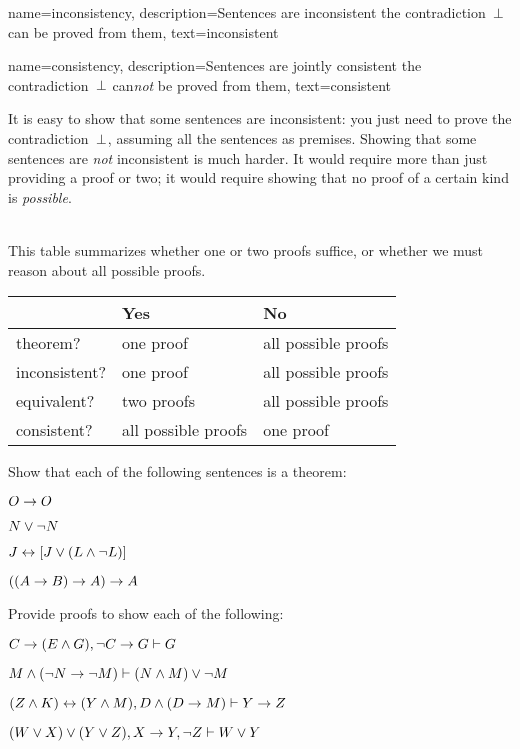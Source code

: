 {    name={inconsistency}, 
  description={Sentences are inconsistent \ifeff{} the contradiction~$\bot$ can be proved from them},
    text={inconsistent}
}

{    name={consistency}, 
  description={Sentences are jointly consistent \ifeff{} the contradiction~$\bot$ can\emph{not} be proved from them},
    text={consistent}
}

It is easy to show that some sentences are inconsistent: you just need
to prove the contradiction~$\bot$, assuming all the sentences as
premises. Showing that some sentences are \emph{not} inconsistent is much
harder. It would require more than just providing a proof or two; it
would require showing that no proof of a certain kind is
\emph{possible}.

\
\\
This table summarizes whether one or two proofs suffice, or whether we must reason about all possible proofs.

\begin{center}
\begin{tabular}{l l l}
 & \textbf{Yes} & \textbf{No}\\
 \hline
theorem? & one proof & all possible proofs\\
inconsistent? &  one proof  & all possible proofs\\
equivalent? & two proofs & all possible proofs\\
consistent? & all possible proofs & one proof\\
\end{tabular}
\end{center}


\practiceproblems
\problempart
Show that each of the following sentences is a theorem:
\begin{compactlist}
\item $O \rightarrow O$
\item $N \vee \neg N$
\item $J \leftrightarrow [J\vee (L\wedge\neg L)]$
\item $((A \rightarrow B) \rightarrow A) \rightarrow A$ 
\end{compactlist}

\problempart
Provide proofs to show each of the following:
\begin{compactlist}
\item $C\rightarrow(E\wedge G), \neg C \rightarrow G \vdash G$
\item $M \wedge (\neg N \rightarrow \neg M) \vdash (N \wedge M) \vee \neg M$
\item $(Z\wedge K)\leftrightarrow(Y\wedge M), D\wedge(D\rightarrow M) \vdash Y\rightarrow Z$
\item $(W \vee X) \vee (Y \vee Z), X\rightarrow Y, \neg Z \vdash W\vee Y$
\end{compactlist}

